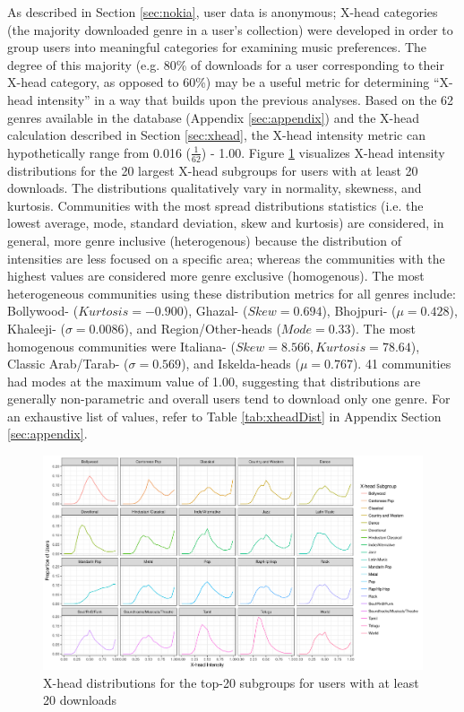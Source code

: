 \documentclass[a4paper]{article}
\begin{document}
As described in Section \ref{sec:nokia}, user data is anonymous; X-head categories (the majority downloaded genre in a user's collection) were developed in order to group users into meaningful categories for examining music preferences. The degree of this majority (e.g. 80\% of downloads for a user corresponding to their X-head category, as opposed to 60\%) may be a useful metric for determining ``X-head intensity'' in a way that builds upon the previous analyses. Based on the 62 genres available in the database (Appendix \ref{sec:appendix}) and the X-head calculation described in Section \ref{sec:xhead}, the X-head intensity metric can hypothetically range from 0.016 ($\frac{1}{62}$) - 1.00. Figure \ref{fig:xweightDists} visualizes X-head intensity distributions for the 20 largest X-head subgroups for users with at least 20 downloads. The distributions qualitatively vary in normality, skewness, and kurtosis. Communities with the most spread distributions statistics (i.e. the lowest average, mode, standard deviation, skew and kurtosis) are considered, in general, more genre inclusive (heterogenous) because the distribution of intensities are less focused on a specific area; whereas the communities with the highest values are considered more genre exclusive (homogenous). The most heterogeneous communities using these distribution metrics for all genres include: Bollywood- ($Kurtosis=-0.900$), Ghazal- ($Skew=0.694$), Bhojpuri- ($\mu=0.428$), Khaleeji- ($\sigma=0.0086$), and Region/Other-heads ($Mode=0.33$). The most homogenous communities were Italiana- ($Skew=8.566, Kurtosis=78.64$), Classic Arab/Tarab- ($\sigma=0.569$), and Iskelda-heads ($\mu=0.767$). 41 communities had modes at the maximum value of 1.00, suggesting that distributions are generally non-parametric and overall users tend to download only one genre. For an exhaustive list of values, refer to Table \ref{tab:xheadDist} in Appendix Section \ref{sec:appendix}.

\begin{figure}[h!]
\centering
\includegraphics[width=\linewidth]{20_xheadDistributions}
\caption[X-head Distribution Sample]{X-head distributions for the top-20 subgroups for users with at least 20 downloads}
\label{fig:xweightDists}
\end{figure}
\end{document}
